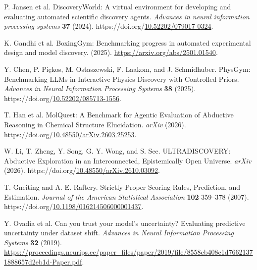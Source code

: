 \documentclass[10pt,a4paper]{article}
\newlength{\csllabelwidth}\setlength{\csllabelwidth}{2em}
\newenvironment{CSLReferences}[2]{\small\setlength{\parindent}{0pt}\setlength{\parskip}{4pt}}{\par}
\newcommand{\CSLLeftMargin}[1]{\par\noindent\makebox[\csllabelwidth][l]{#1}}
\newcommand{\CSLRightInline}[1]{\parbox[t]{\dimexpr\linewidth-\csllabelwidth\relax}{#1}\par}
\begin{document}
\begin{CSLReferences}{0}{1}
\hypertarget{ref-jansen2024discoveryworld}{}
\CSLLeftMargin{17. }%
\CSLRightInline{P. Jansen et al. {DiscoveryWorld}: A virtual environment for developing and evaluating automated scientific discovery agents. \emph{Advances in neural information processing systems} \textbf{37} (2024). https://doi.org/\href{https://doi.org/10.52202/079017-0324}{10.52202/079017-0324}.}

\hypertarget{ref-gandhi2025boxinggym}{}
\CSLLeftMargin{18. }%
\CSLRightInline{K. Gandhi et al. {BoxingGym}: Benchmarking progress in automated experimental design and model discovery. (2025). \url{https://arxiv.org/abs/2501.01540}.}

\hypertarget{ref-chen2025physgym}{}
\CSLLeftMargin{19. }%
\CSLRightInline{Y. Chen, P. Piękos, M. Ostaszewski, F. Laakom, and J. Schmidhuber. {PhysGym: Benchmarking LLMs in Interactive Physics Discovery with Controlled Priors}. \emph{{Advances in Neural Information Processing Systems}} \textbf{38} (2025). https://doi.org/\href{https://doi.org/10.52202/085713-1556}{10.52202/085713-1556}.}

\hypertarget{ref-han2026molquest}{}
\CSLLeftMargin{20. }%
\CSLRightInline{T. Han et al. {MolQuest: A Benchmark for Agentic Evaluation of Abductive Reasoning in Chemical Structure Elucidation}. \emph{arXiv} (2026). https://doi.org/\href{https://doi.org/10.48550/arXiv.2603.25253}{10.48550/arXiv.2603.25253}.}

\hypertarget{ref-li2026ultradiscovery}{}
\CSLLeftMargin{21. }%
\CSLRightInline{W. Li, T. Zheng, Y. Song, G. Y. Wong, and S. See. {ULTRADISCOVERY: Abductive Exploration in an Interconnected, Epistemically Open Universe}. \emph{arXiv} (2026). https://doi.org/\href{https://doi.org/10.48550/arXiv.2610.03092}{10.48550/arXiv.2610.03092}.}

\hypertarget{ref-gneiting2007scoring}{}
\CSLLeftMargin{22. }%
\CSLRightInline{T. Gneiting and A. E. Raftery. {Strictly Proper Scoring Rules, Prediction, and Estimation}. \emph{Journal of the American Statistical Association} \textbf{102} 359--378 (2007). https://doi.org/\href{https://doi.org/10.1198/016214506000001437}{10.1198/016214506000001437}.}

\hypertarget{ref-ovadia2019uncertainty}{}
\CSLLeftMargin{23. }%
\CSLRightInline{Y. Ovadia et al. {Can you trust your model's uncertainty? Evaluating predictive uncertainty under dataset shift}. \emph{{Advances in Neural Information Processing Systems}} \textbf{32} (2019). \url{https://proceedings.neurips.cc/paper_files/paper/2019/file/8558cb408c1d76621371888657d2eb1d-Paper.pdf}.}

\end{CSLReferences}
\end{document}
